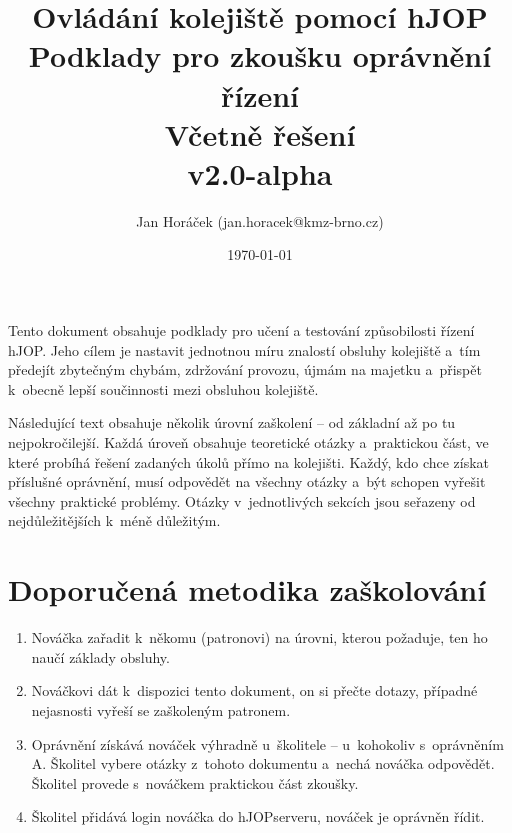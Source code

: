 \documentclass[12pt,a4paper]{article}
\begin{document}
\thispagestyle{empty}

\setlength{\parindent}{0cm}
\setlength{\parskip}{1mm plus2pt minus1pt}
\setlength{\droptitle}{-5em}

\title{
\Large Ovládání kolejiště pomocí hJOP\\
\LARGE Podklady pro zkoušku oprávnění řízení\\
\ifdefined\issolution
\normalsize Včetně řešení \\
\fi
\small v2.0-alpha}
\author{Jan Horáček (jan.horacek@kmz-brno.cz)}
\date{\today}
\maketitle

Tento dokument obsahuje podklady pro učení a testování způsobilosti řízení
hJOP. Jeho cílem je nastavit jednotnou míru znalostí obsluhy kolejiště a~tím
předejít zbytečným chybám, zdržování provozu, újmám na majetku a~přispět
k~obecně lepší součinnosti mezi obsluhou kolejiště.

Následující text obsahuje několik úrovní zaškolení – od základní až po tu
nejpokročilejší. Každá úroveň obsahuje teoretické otázky a~praktickou část, ve
které probíhá řešení zadaných úkolů přímo na kolejišti. Každý, kdo chce získat
příslušné oprávnění, musí odpovědět na všechny otázky a~být schopen vyřešit
všechny praktické problémy. Otázky v~jednotlivých sekcích jsou seřazeny od
nejdůležitějších k~méně důležitým.

\section{Doporučená metodika zaškolování}

\begin{enumerate}[leftmargin=*]
\item Nováčka zařadit k~někomu (patronovi) na úrovni, kterou požaduje, ten ho
naučí základy obsluhy.
\item Nováčkovi dát k~dispozici tento dokument, on si přečte dotazy, případné
nejasnosti vyřeší se zaškoleným patronem.
\item Oprávnění získává nováček výhradně u~školitele – u~kohokoliv s~oprávněním
A. Školitel vybere otázky z~tohoto dokumentu a~nechá nováčka odpovědět. Školitel
provede s~no\-váč\-kem praktickou část zkoušky.
\item Školitel přidává login nováčka do hJOPserveru, nováček je oprávněn řídit.
\end{enumerate}
\end{document}

